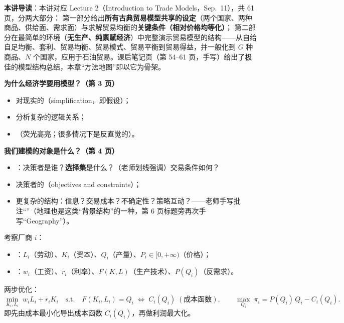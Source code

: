 
\textbf{本讲导读}：本讲对应 Lecture 2（Introduction to Trade Models，Sep.\ 11），共 61 页，分两大部分：
第一部分给出\textbf{所有古典贸易模型共享的设定}（两个国家、两种商品、供给面、需求面）与求解贸易均衡的\textbf{关键条件（相对价格均等化）}；
第二部分在最简单的环境（\textbf{无生产、纯禀赋经济}）中完整演示贸易模型的结构——从自给自足均衡、套利、贸易均衡、贸易模式、贸易平衡到贸易得益，并一般化到 $G$ 种商品、$N$ 个国家，应用于石油贸易。课后笔记页（第 54--61 页，手写）给出了极佳的模型结构总结，本章``方法地图''即以它为骨架。


\textbf{为什么经济学要用模型？（第 3 页）}
\begin{itemize}
  \item 对现实的（simplification，即假设）；
  \item 分析复杂的逻辑关系；
  \item {}（荧光高亮；很多情况下是反直觉的）。
\end{itemize}

\textbf{我们建模的对象是什么？（第 4 页）}
\begin{itemize}
  \item {}：决策者是谁？\textbf{选择集}是什么？（老师划线强调）交易条件如何？
  \item 决策者的（objectives and constraints）；
  \item 更复杂的结构：信息？交易成本？不确定性？策略互动？——老师手写批注``''（地理也是这类``背景结构''的一种，第 6 页标题旁再次手写``Geography''）。
\end{itemize}

\begin{exbox}
考察厂商 $i$：
\begin{itemize}
  \item {}：$L_i$（劳动）、$K_i$（资本）、$Q_i$（产量）、$P_i \in [0,+\infty)$（价格）；
  \item {}：$w_i$（工资）、$r_i$（利率）、$F(K,L)$（生产技术）、$P(Q_i)$（反需求）。
\end{itemize}
两步优化：
\[
\min_{K_i, L_i}\; w_i L_i + r_i K_i \quad \text{s.t.}\quad F(K_i, L_i) = Q_i
\;\Longleftrightarrow\; C_i(Q_i) \;(\text{成本函数}),
\qquad
\max_{Q_i}\; \pi_i = P(Q_i)\, Q_i - C_i(Q_i).
\]
即先由成本最小化导出成本函数 $C_i(Q_i)$，再做利润最大化。
\end{exbox}

